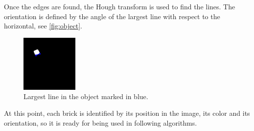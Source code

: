 Once the edges are found, the Hough transform is used to find the lines. The orientation is defined by the angle of the largest line with respect to the horizontal, see \autoref{fig:object}.

\begin{figure}[H]
    \includegraphics[width=0.25\textwidth]{figures/object.png}
    \caption{Largest line in the object marked in blue.}
    \label{fig:object}
\end{figure}

At this point, each brick is identified by its position in the image, its color and its orientation, so it is ready for being used in following algorithms.
